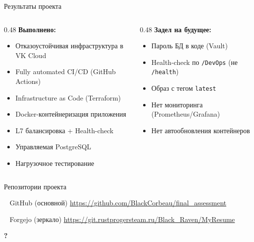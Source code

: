 \documentclass[10pt,aspectratio=169]{beamer}
\begin{document}
\begin{frame}{Результаты проекта}

  \begin{columns}[T]
    \begin{column}{0.48\textwidth}
      \textbf{Выполнено:}
      \begin{itemize}
        \item Отказоустойчивая инфраструктура в VK Cloud
        \item Fully automated CI/CD (GitHub Actions)
        \item Infrastructure as Code (Terraform)
        \item Docker-контейнеризация приложения
        \item L7 балансировка + Health-check
        \item Управляемая PostgreSQL
        \item Нагрузочное тестирование
      \end{itemize}
    \end{column}
    \begin{column}{0.48\textwidth}
      \textbf{Задел на будущее:}
      \begin{itemize}
        \item Пароль БД в коде (Vault)
        \item Health-check по \texttt{/DevOps} (не \texttt{/health})
        \item Образ с тегом \texttt{latest}
        \item Нет мониторинга (Prometheus/Grafana)
        \item Нет автообновления контейнеров
      \end{itemize}
    \end{column}
  \end{columns}
\end{frame}

\begin{frame}{Репозитории проекта}

  \centering
  \vspace{0.3cm}
  \begin{block}{\faGithub ~ GitHub (основной)}
    \centering
    \url{https://github.com/BlackCorbeau/final_assessment}
  \end{block}

  \vspace{0.2cm}
  \begin{block}{\faGitAlt ~ Forgejo (зеркало)}
    \centering
    \url{https://git.rustprogersteam.ru/Black_Raven/MyResume}
  \end{block}

  \vspace{0.5cm}
  \begin{center}
    \textbf{\Huge\color{accent}?}
  \end{center}
\end{frame}
\end{document}
